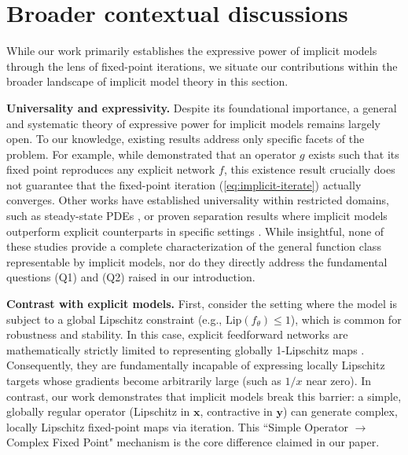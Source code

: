 \documentclass{amsart} %
\def\eqref#1{equation~\ref{#1}}
\def\vx{{\bm{x}}}
\def\vy{{\bm{y}}}
\theoremstyle{definition}
\theoremstyle{remark}
\renewcommand{\eqref}[1]{\textup{(\ref{#1})}}
\begin{document}
\section{Broader contextual discussions}
\label{app:refs}

While our work primarily establishes the expressive power of implicit models through the lens of fixed-point iterations, we situate our contributions within the broader landscape of implicit model theory in this section.

\textbf{Universality and expressivity.} Despite its foundational importance, a general and systematic theory of expressive power for implicit models remains largely open. To our knowledge, existing results address only specific facets of the problem. 
For example, while \cite{bai2019deep} demonstrated that an operator $g$ exists such that its fixed point reproduces any explicit network $f$, this existence result crucially does not guarantee that the fixed-point iteration \eqref{eq:implicit-iterate} actually converges. Other works have established universality within restricted domains, such as steady-state PDEs \cite{marwah2023deep}, or proven separation results where implicit models outperform explicit counterparts in specific settings \cite{wu2024separation}. While insightful, none of these studies provide a complete characterization of the general function class representable by implicit models, nor do they directly address the fundamental questions (Q1) and (Q2) raised in our introduction.

\textbf{Contrast with explicit models.} First, consider the setting where the model is subject to a global Lipschitz constraint (e.g., $\text{Lip}(f_\theta) \le 1$), which is common for robustness and stability. In this case, explicit feedforward networks are mathematically strictly limited to representing globally 1-Lipschitz maps \cite{murari2025approximation}. Consequently, they are fundamentally incapable of expressing locally Lipschitz targets whose gradients become arbitrarily large (such as $1/x$ near zero). In contrast, our work demonstrates that implicit models break this barrier: a simple, globally regular operator (Lipschitz in $\vx$, contractive in $\vy$) can generate complex, locally Lipschitz fixed-point maps via iteration. This ``Simple Operator $\to$ Complex Fixed Point" mechanism is the core difference claimed in our paper.
\end{document}
